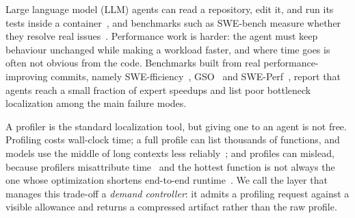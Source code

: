 \documentclass[conference]{IEEEtran}
\begin{document}
Large language model (LLM) agents can read a repository, edit it, and run its
tests inside a container~\cite{yang2024sweagent,xia2024agentless}, and
benchmarks such as SWE-bench measure whether they resolve real
issues~\cite{jimenez2024swebench,hou2024llm4se}. Performance work is harder:
the agent must keep behaviour unchanged while making a workload faster, and
where time goes is often not obvious from the code. Benchmarks built from real
performance-improving commits, namely SWE-fficiency~\cite{ma2025swefficiency},
GSO~\cite{shetty2025gso} and SWE-Perf~\cite{he2025sweperf}, report that agents
reach a small fraction of expert speedups and list poor bottleneck
localization among the main failure modes.

A profiler is the standard localization tool, but giving one to an agent is
not free. Profiling costs wall-clock time; a full profile can list thousands
of functions, and models use the middle of long contexts less
reliably~\cite{liu2024lost}; and profiles can mislead, because profilers
misattribute time~\cite{mytkowicz2010evaluating} and the hottest function is
not always the one whose optimization shortens end-to-end
runtime~\cite{curtsinger2015coz}. We call the layer that manages this
trade-off a \emph{demand controller}: it admits a profiling request against a
visible allowance and returns a compressed artifact rather than the raw
profile.
\end{document}
